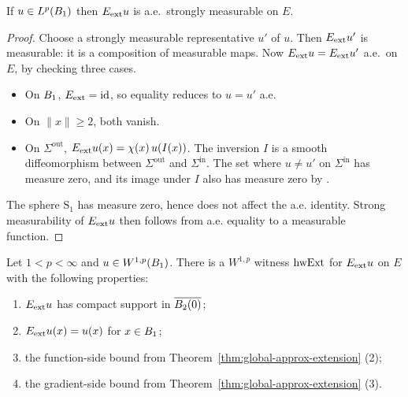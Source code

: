 \begin{lemma}
\label{lem:aestronglyMeasurable_unitBallExtension_of_memLp}
\leanok
{}
If $u \in L^p(B_{1})$ then $E_{\mathrm{ext}} u$ is a.e.\ strongly measurable on $E$.
\end{lemma}

\begin{proof}
\leanok
{}

Choose a strongly measurable representative $u'$ of $u$. Then $E_{\mathrm{ext}} u'$ is
measurable: it is a composition of measurable maps. Now $E_{\mathrm{ext}} u =
E_{\mathrm{ext}} u'$ a.e.\ on $E$, by checking three cases.
\begin{itemize}
\item On $B_{1}$, $E_{\mathrm{ext}} = \mathrm{id}$, so equality reduces to $u = u'$
a.e.
\item On $\|x\| \ge 2$, both vanish.
\item On $\Sigma^{\mathrm{out}}$, $E_{\mathrm{ext}} u(x) = \chi(x)\, u(I(x))$. The
inversion $I$ is a smooth diffeomorphism between $\Sigma^{\mathrm{out}}$ and
$\Sigma^{\mathrm{in}}$. The set where $u \neq u'$ on $\Sigma^{\mathrm{in}}$
has measure zero, and its image under $I$ also has measure zero by
.
\end{itemize}
The sphere $\mathrm{S}_1$ has measure zero, hence does not affect the a.e.
identity. Strong measurability of $E_{\mathrm{ext}} u$ then follows from a.e. equality
to a measurable function.
\end{proof}

\begin{theorem}
\label{thm:Eext-W1p}
\leanok
{}
Let $1 < p < \infty$ and $u \in W^{1,p}(B_{1})$. There is a $W^{1,p}$
witness $\mathrm{hwExt}$ for $E_{\mathrm{ext}} u$ on $E$ with the following properties:
\begin{enumerate}
\item $E_{\mathrm{ext}} u$ has compact support in $\overline{B_{2}(0)}$;
\item $E_{\mathrm{ext}} u(x) = u(x)$ for $x \in B_{1}$;
\item the function-side bound from Theorem~\ref{thm:global-approx-extension} (2);
\item the gradient-side bound from Theorem~\ref{thm:global-approx-extension} (3).
\end{enumerate}
\end{theorem}

